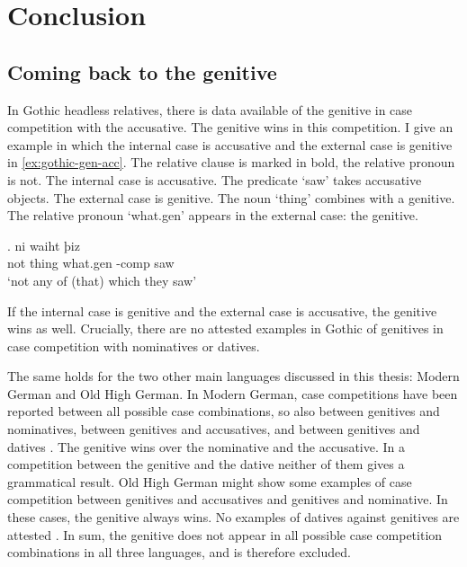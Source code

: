 
\chapter{Conclusion}\label{ch:conclusion}


\section{Coming back to the genitive}\label{sec:genitive}

In Gothic headless relatives, there is data available of the genitive in case competition with the accusative. The genitive wins in this competition.
I give an example in which the internal case is accusative and the external case is genitive in \ref{ex:gothic-gen-acc}.
The relative clause is marked in bold, the relative pronoun is not.
The internal case is accusative. The predicate  `saw' takes accusative objects.
The external case is genitive. The noun  `thing' combines with a genitive.
The relative pronoun  `what.\ac{gen}' appears in the external case: the genitive.

\exg. ni waiht þiz  \\
 not thing\scsub{[gen]} what.\ac{gen} -\ac{comp} saw\scsub{[acc]}\\
 `not any of (that) which they saw' \label{ex:gothic-gen-acc}

If the internal case is genitive and the external case is accusative, the genitive wins as well. Crucially, there are no attested examples in Gothic of genitives in case competition with nominatives or datives.

The same holds for the two other main languages discussed in this thesis: Modern German and Old High German.
In Modern German, case competitions have been reported between all possible case combinations, so also between genitives and nominatives, between genitives and accusatives, and between genitives and datives \citep[cf.][]{vogel2001}. The genitive wins over the nominative and the accusative. In a competition between the genitive and the dative neither of them gives a grammatical result.
Old High German might show some examples of case competition between genitives and accusatives and genitives and nominative. In these cases, the genitive always wins. No examples of datives against genitives are attested \citep{behaghel1923}.
In sum, the genitive does not appear in all possible case competition combinations in all three languages, and is therefore excluded.

